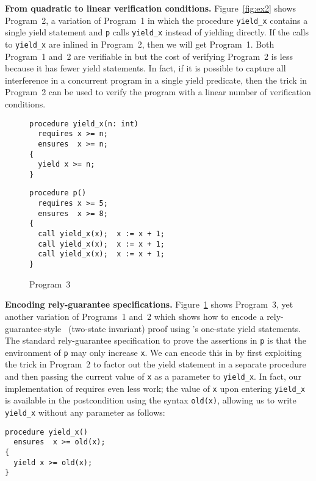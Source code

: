 {\bf From quadratic to linear verification conditions.}
Figure~\ref{fig:ex2} shows Program~2, a variation of Program~1 in which the procedure {\tt yield\_x} 
contains a single yield statement and {\tt p} calls {\tt yield\_x} instead of yielding directly.
If the calls to {\tt yield\_x} are inlined in Program~2, then we will get Program~1.
Both Program~1 and~2 are verifiable in \civl but the cost of verifying Program~2 is less because it has fewer yield statements.
In fact, if it is possible to capture all interference in a concurrent program in a single yield predicate, 
then the trick in Program~2 can be used to verify the program with a linear number of verification conditions.

\begin{figure}
\begin{verbatim}
procedure yield_x(n: int)
  requires x >= n;
  ensures  x >= n;
{
  yield x >= n;
}
\end{verbatim}
\begin{verbatim}
procedure p()
  requires x >= 5;
  ensures  x >= 8;
{
  call yield_x(x);  x := x + 1;
  call yield_x(x);  x := x + 1;
  call yield_x(x);  x := x + 1;
}
\end{verbatim}
\caption{Program~3}
\label{fig:ex3}
\end{figure}

{\bf Encoding rely-guarantee specifications.}
Figure~\ref{fig:ex3} shows Program~3, yet another variation of Programs~1 and~2 which shows how to encode a rely-guarantee-style~\cite{Jones83} (two-state invariant)
proof using \civl's one-state yield statements. 
The standard rely-guarantee specification to prove the assertions in {\tt p} is that the environment of {\tt p} 
may only increase {\tt x}.
We can encode this in \civl by first exploiting the trick in Program~2 to factor out the yield statement in a separate procedure
and then passing the current value of {\tt x} as a parameter to {\tt yield\_x}.
In fact, our implementation of \civl requires even less work; the value of {\tt x} upon entering {\tt yield\_x} is available 
in the postcondition using the syntax {\tt old(x)}, allowing us to write {\tt yield\_x} without any parameter as follows:
\begin{verbatim}
procedure yield_x()
  ensures  x >= old(x);
{
  yield x >= old(x);
}
\end{verbatim}



